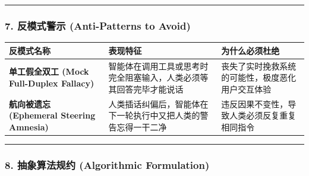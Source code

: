 \begin{center}\rule{0.5\linewidth}{0.5pt}\end{center}

\subsubsection{7. 反模式警示 (Anti-Patterns to
Avoid)}\label{ux53cdux6a21ux5f0fux8b66ux793a-anti-patterns-to-avoid-16}

{\def\LTcaptype{} %
\begin{longtable}[]{@{}
  >{\raggedright\arraybackslash}p{}
  >{\raggedright\arraybackslash}p{}
  >{\raggedright\arraybackslash}p{}@{}}
\toprule\noalign{}
\begin{minipage}[b]{\linewidth}\raggedright
反模式名称
\end{minipage} & \begin{minipage}[b]{\linewidth}\raggedright
表现特征
\end{minipage} & \begin{minipage}[b]{\linewidth}\raggedright
为什么必须杜绝
\end{minipage} \\
\midrule\noalign{}
\endhead
\bottomrule\noalign{}
\endlastfoot
\textbf{单工假全双工 (Mock Full-Duplex Fallacy)} &
智能体在调用工具或思考时完全阻塞输入，人类必须等其回答完毕才能说话 &
丧失了实时挽救系统的可能性，极度恶化用户交互体验 \\
\textbf{航向被遗忘 (Ephemeral Steering Amnesia)} &
人类插话纠偏后，智能体在下一轮执行中又把人类的警告忘得一干二净 &
违反因果不变性，导致人类必须反复重复相同指令 \\
\end{longtable}
}

\begin{center}\rule{0.5\linewidth}{0.5pt}\end{center}

\subsubsection{8. 抽象算法规约 (Algorithmic
Formulation)}\label{ux62bdux8c61ux7b97ux6cd5ux89c4ux7ea6-algorithmic-formulation-15}

